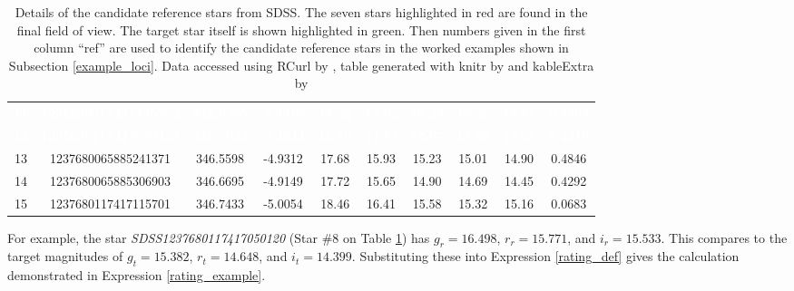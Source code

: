 \documentclass[referee]{aa}
\begin{document}
\begin{table}[!htb]
\begin{tabular}{cccccccccc}
\rowcolor[HTML]{D7261E}  \textcolor{white}{\textbf{11}} & \textcolor{white}{\textbf{1237680117417115762}} & \textcolor{white}{\textbf{346.6755}} & \textcolor{white}{\textbf{-5.1195}} & \textcolor{white}{\textbf{18.92}} & \textcolor{white}{\textbf{17.02}} & \textcolor{white}{\textbf{16.28}} & \textcolor{white}{\textbf{15.97}} & \textcolor{white}{\textbf{15.85}} & \textcolor{white}{\textbf{0.3804}}\\
\rowcolor[HTML]{D7261E}  \textcolor{white}{\textbf{12}} & \textcolor{white}{\textbf{1237680117417050133}} & \textcolor{white}{\textbf{346.5944}} & \textcolor{white}{\textbf{-5.1611}} & \textcolor{white}{\textbf{16.70}} & \textcolor{white}{\textbf{14.83}} & \textcolor{white}{\textbf{14.07}} & \textcolor{white}{\textbf{13.89}} & \textcolor{white}{\textbf{13.65}} & \textcolor{white}{\textbf{0.2410}}\\
13 & 1237680065885241371 & 346.5598 & -4.9312 & 17.68 & 15.93 & 15.23 & 15.01 & 14.90 & 0.4846\\
14 & 1237680065885306903 & 346.6695 & -4.9149 & 17.72 & 15.65 & 14.90 & 14.69 & 14.45 & 0.4292\\
15 & 1237680117417115701 & 346.7433 & -5.0054 & 18.46 & 16.41 & 15.58 & 15.32 & 15.16 & 0.0683\\
\hline
\end{tabular}
\caption{\label{candidate_references}Details of the candidate reference stars from SDSS.  The
seven stars highlighted in red are found in the final field of view. The target star itself
is shown highlighted in green.  Then numbers given in the first column ``ref'' are used to identify the candidate reference stars in the worked examples shown in Subsection \ref{example_loci}.  Data  accessed using RCurl by \citet{rcurl}, table generated with knitr by \citet{knitr1,knitr2,knitr3} and kableExtra by \citet{kableExtra}}
\end{table}



For example, the star \textit{SDSS1237680117417050120} (Star \#{}8 on Table \ref{candidate_references}) has
${g_r = 16.498}$, ${r_r = 15.771}$, and $i_r = 15.533$. This compares
to the target magnitudes of ${g_t = 15.382}$, ${r_t = 14.648}$, and
${i_t = 14.399}$.  Substituting these into Expression \ref{rating_def} gives the calculation demonstrated in Expression \ref{rating_example}.
\end{document}
